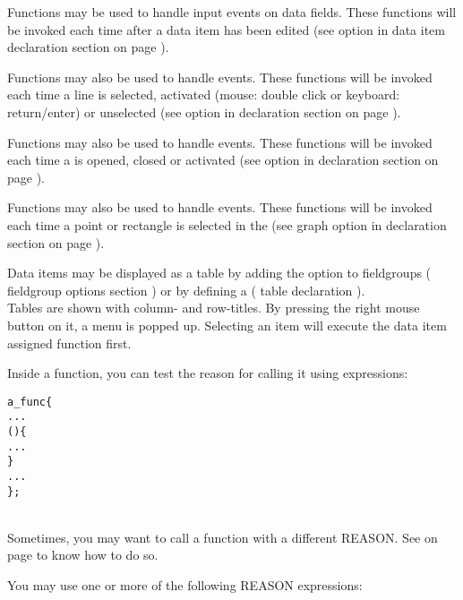 Functions may be used to handle input events on data fields. These functions will be invoked each time after
  a data item has been edited (see \FUNC{} option in \DATAPOOL{} data item declaration
  section  on page \pageref{sec:dpitem}).

Functions may also be used to handle \LIST{} events. These functions will be invoked each time a
  line is selected, activated (mouse: double click or keyboard: return/enter) or unselected (see \FUNC{}
  option in \LIST{} declaration section  on page \pageref{dia:uilistoptionlist}).

Functions may also be used to handle \FORM{} events. These functions will be invoked each time a \FORM{}
  is opened, closed or activated (see \FUNC{} option in \FORM{} declaration section
   on page \pageref{dia:uiformoptionlist}).

Functions may also be used to handle \PLOTTWOD{} events. These functions will be invoked each time a
  point or rectangle is selected in the \PLOTTWOD{} (see graph option \FUNC{} in \PLOTTWOD{} declaration
  section  on page \pageref{dia:uiplot2dgraphoption}).

Data items may be displayed as a table by adding the \TABLESIZE{} option to fieldgroups
  (\UIMANAGER{} fieldgroup options section ) or by defining a \TABLE{}
  (\UIMANAGER{} table declaration ). \\
Tables are shown with column- and row-titles. By pressing the right mouse button on it, a menu is popped up.
Selecting an item will execute the data item assigned function first.

Inside a function, you can test the reason for calling it using \REASON{} expressions:

\begin{boxedminipage}[t]{\linewidth}
\begin{alltt}
  \FUNC a\_func \{
    ...
    \IF(\REASONINPUT) \{
      ...
    \}
    ...
  \};
\end{alltt}
\end{boxedminipage} \\[2ex]

Sometimes, you may want to call a function with a different REASON.
See  on page \pageref{dia:setfuncstatement} to know
how to do so.

You may use one or more of the following REASON expressions:

